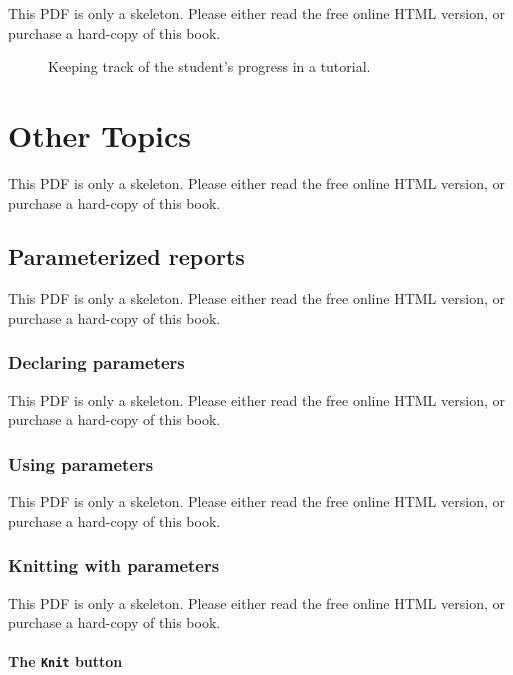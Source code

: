 \documentclass[
  11pt,
]{krantz}
\theoremstyle{definition}
\theoremstyle{definition}
\theoremstyle{definition}
\theoremstyle{definition}
\theoremstyle{remark}
\begin{document}
This PDF is only a skeleton. Please either read the free online HTML version, or purchase a hard-copy of this book.

\begin{figure}\caption{Keeping track of the student's progress in a tutorial.}\end{figure}

\part{Other Topics}\label{part-other-topics}

This PDF is only a skeleton. Please either read the free online HTML version, or purchase a hard-copy of this book.

\chapter{Parameterized reports}\label{parameterized-reports}

This PDF is only a skeleton. Please either read the free online HTML version, or purchase a hard-copy of this book.

\section{Declaring parameters}\label{params-declare}

This PDF is only a skeleton. Please either read the free online HTML version, or purchase a hard-copy of this book.

\section{Using parameters}\label{params-use}

This PDF is only a skeleton. Please either read the free online HTML version, or purchase a hard-copy of this book.

\section{Knitting with parameters}\label{params-knit}

This PDF is only a skeleton. Please either read the free online HTML version, or purchase a hard-copy of this book.

\subsection{\texorpdfstring{The \texttt{Knit} button}{The Knit button}}\label{the-knit-button}
\end{document}
